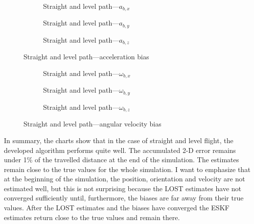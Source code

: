 \begin{figure}[H]
    \centering
    \begin{subfigure}{0.3\textwidth}
        
        \caption{Straight and level path---$a_{b,x}$}
    \end{subfigure}
    \hfill
    \begin{subfigure}{0.3\textwidth}
        
        \caption{Straight and level path---$a_{b,y}$}
    \end{subfigure}
    \hfill
    \begin{subfigure}{0.3\textwidth}
        
        \caption{Straight and level path---$a_{b,z}$}
    \end{subfigure}
    \caption{Straight and level path---acceleration bias}\label{fig:straight-level-abias}
\end{figure}

\begin{figure}[H]
    \centering
    \begin{subfigure}{0.3\textwidth}
        
        \caption{Straight and level path---$\omega_{b,x}$}
    \end{subfigure}
    \hfill
    \begin{subfigure}{0.3\textwidth}
        
        \caption{Straight and level path---$\omega_{b,y}$}
    \end{subfigure}
    \hfill
    \begin{subfigure}{0.3\textwidth}
        
        \caption{Straight and level path---$\omega_{b,z}$}
    \end{subfigure}
    \caption{Straight and level path---angular velocity bias}\label{fig:straight-level-wbias}
\end{figure}

In summary, the charts show that in the case of straight and level flight, the developed algorithm performs quite well. The accumulated 2-D error remains under 1\% of the travelled distance at the end of the simulation. The estimates remain close to the true values for the whole simulation. I want to emphasize that at the beginning of the simulation, the position, orientation and velocity are not estimated well, but this is not surprising because the LOST estimates have not converged sufficiently until, furthermore, the biases are far away from their true values. After the LOST estimates and the biases have converged the ESKF estimates return close to the true values and remain there.

